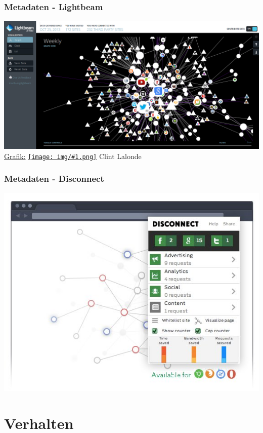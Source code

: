 \documentclass[12pt]{beamer}
\newcommand{\cc}[1]{\texttt{[image: img/\#1.png]}\hspace{1mm}}
\begin{document}
\begin{frame}
    \frametitle{Metadaten - Lightbeam}
    \includegraphics[height=0.7\textheight]{img/lightbeam.png}
  \\{\small \href{http://www.flickr.com/photos/8517757@N03/10538205035/in/photolist-h4e4dg}{Grafik:} \href{http://creativecommons.org/licenses/by-sa/3.0/deed.en}{\cc{by-sa}} Clint Lalonde}
\end{frame}

\begin{frame}
  \frametitle{Metadaten - Disconnect}
  \includegraphics[height=0.7\textheight]{img/disconnectme.jpg}
\end{frame}

\section{Verhalten}
\subsection{}
\end{document}
